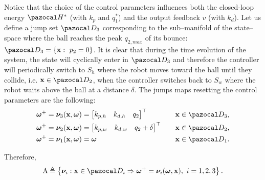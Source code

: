 Notice that the choice of the control parameters influences both the closed-loop energy $\Ha^*$ (with $k_p$ and $q_1^*$) and the output feedback $v$ (with $k_d$).
%
Let us define a jump set $\D_3$ corresponding to the sub--manifold of the state--space where the ball reaches the peak $q_{2,max}$ of its bounce: $\D_3 = \left\{\xb:~p_2=0\right\}$.
It is clear that during the time evolution of the system, the state will cyclically enter in $\D_3$ and therefore the controller will periodically switch to $S_h$ where the robot moves toward the ball until they collide, i.e. $\xb\in\D_2$, when the controller switches back to $S_w$ where the robot waits above the ball at a distance $\delta$. The jumps maps resetting the control parameters are the following:
%
\begin{align}
\bm\omega^+ = \bm\nu_{3}(\xb,\bm\omega) &=\begin{bmatrix}k_{p,h}&k_{d,h}&q_2\end{bmatrix}^\top &\quad&\xb\in\D_3,\\
\bm\omega^+ = \bm\nu_{2}(\xb,\bm\omega) &=\begin{bmatrix}k_{p,w}&k_{d,w}&q_2 + \delta\end{bmatrix}^\top &\quad&\xb\in\D_2,\\
\bm\omega^+ = \bm\nu_{1}(\xb,\bm\omega) &= \bm\omega &\quad&\xb\in\D_1.
\end{align}
%

Therefore,
%
\begin{equation}
    \Lambda \triangleq \left\{{\bm\nu}_i:\xb\in\D_i\Rightarrow \bm\omega^+ = \bm\nu_i(\bm\omega,\xb),~ i = 1,2,3\right\}.
\end{equation}
%

